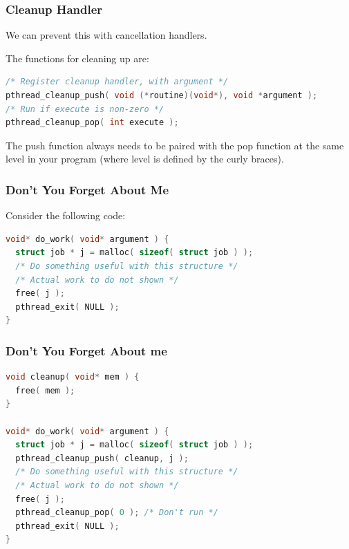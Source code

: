 \begin{frame}[fragile]
	\frametitle{Cleanup Handler}

	We can prevent this with cancellation handlers.

	The functions for cleaning up are:

	\begin{lstlisting}[language=C]
/* Register cleanup handler, with argument */
pthread_cleanup_push( void (*routine)(void*), void *argument );
/* Run if execute is non-zero */
pthread_cleanup_pop( int execute );
\end{lstlisting}

	The push function always needs to be paired with the pop function at the same level in your program (where level is defined by the curly braces).

\end{frame}


\begin{frame}[fragile]
	\frametitle{Don't You Forget About Me}

	Consider the following code:
	\begin{lstlisting}[language=C]
void* do_work( void* argument ) {
  struct job * j = malloc( sizeof( struct job ) );
  /* Do something useful with this structure */
  /* Actual work to do not shown */
  free( j );
  pthread_exit( NULL );
}
\end{lstlisting}


\end{frame}



\begin{frame}[fragile]
	\frametitle{Don't You Forget About me}

	\begin{lstlisting}[language=C]
void cleanup( void* mem ) {
  free( mem );
}

void* do_work( void* argument ) {
  struct job * j = malloc( sizeof( struct job ) );
  pthread_cleanup_push( cleanup, j );
  /* Do something useful with this structure */
  /* Actual work to do not shown */
  free( j );
  pthread_cleanup_pop( 0 ); /* Don't run */
  pthread_exit( NULL );
}
\end{lstlisting}


\end{frame}







